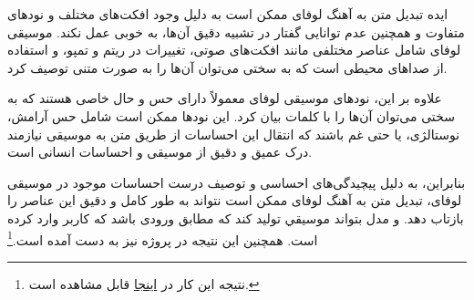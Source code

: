 ایده تبدیل متن به آهنگ لوفای  ممکن است به دلیل وجود افکت‌های مختلف و نودهای متفاوت و همچنین عدم توانایی گفتار در تشبیه دقیق آن‌ها، به خوبی عمل نکند. موسیقی لوفای شامل عناصر مختلفی مانند افکت‌های صوتی، تغییرات در ریتم و تمپو، و استفاده از صداهای محیطی است که به سختی می‌توان آن‌ها را به صورت متنی توصیف کرد.

علاوه بر این، نودهای موسیقی لوفای معمولاً دارای حس و حال خاصی هستند که به سختی می‌توان آن‌ها را با کلمات بیان کرد. این نودها ممکن است شامل حس آرامش، نوستالژی، یا حتی غم باشند که انتقال این احساسات از طریق متن به موسیقی نیازمند درک عمیق و دقیق از موسیقی و احساسات انسانی است.

بنابراین، به دلیل پیچیدگی‌های احساسی و توصیف درست احساسات موجود در موسیقی لوفای، تبدیل متن به آهنگ لوفای ممکن است نتواند به طور کامل و دقیق این عناصر را بازتاب دهد. و مدل بتواند موسیقي تولید کند که مطابق ورودی باشد که کاربر وارد کرده است. همچنین این نتیجه در پروژه  \cite{Lofi} نیز به دست آمده است.\footnote{نتیجه این کار در \href{https://github.com/jacbz/Lofi/tree/main/model\#lyrics2lofi}{اینجا} قابل مشاهده است.}
